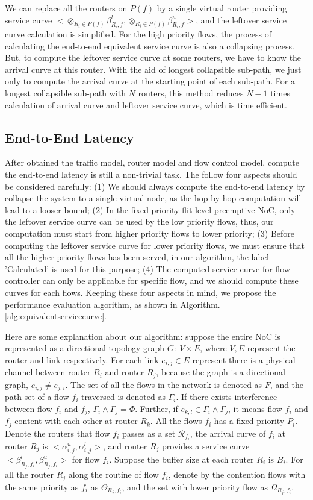 \documentclass[10pt,journal]{IEEEtran}
\begin{document}
We can replace all the routers on $P(f)$ by a single virtual router providing service curve $<\otimes_{R_i\in P(f)}\beta_{R_i,f}^l,\otimes_{R_i\in P(f)}\beta_{R_i,f}^u>$, and the leftover service curve calculation is simplified. For the high priority flows, the process of calculating the end-to-end equivalent service curve is also a collapsing process. But, to compute the leftover service curve at some routers, we have to know the arrival curve at this router. With the aid of longest collapsible sub-path, we just only to compute the arrival curve at the starting point of each sub-path. For a longest collapsible sub-path with $N$ routers, this method reduces $N-1$ times calculation of arrival curve and leftover service curve, which is time efficient.

\subsection{End-to-End Latency}
After obtained the traffic model, router model and flow control model, compute the end-to-end latency is still a non-trivial task. The follow four aspects should be considered carefully: (1) We should always compute the end-to-end latency by collapse the system to a single virtual node, as the hop-by-hop computation will lead to a looser bound; (2) In the fixed-priority flit-level preemptive NoC, only the leftover service curve can be used by the low priority flows, thus, our computation must start from higher priority flows to lower priority; (3) Before computing the leftover service curve for lower priority flows, we must ensure that all the higher priority flows has been served, in our algorithm, the label 'Calculated' is used for this purpose; (4) The computed service curve for flow controller can only be applicable for specific flow, and we should compute these curves for each flows. Keeping these four aspects in mind, we propose the performance evaluation algorithm, as shown in Algorithm. \ref{alg:equivalentservicecurve}.

Here are some explanation about our algorithm: suppose the entire NoC is represented as a directional topology graph $G:\ V\times E$, where $V,E$ represent the router and link respectively. For each link $e_{i,j}\in E$ represent there is a physical channel between router $R_i$ and router $R_j$, because the graph is a directional graph, $e_{i,j}\neq e_{j,i}$. The set of all the flows in the network is denoted as $F$, and the path set of a flow $f_i$ traversed is denoted as $\Gamma_i$. If there exists interference between flow $f_i$ and $f_j$, $\Gamma_i\wedge\Gamma_j=\Phi$. Further, if $e_{k,l}\in\Gamma_i\wedge\Gamma_j$, it means flow $f_i$ and $f_j$ content with each other at router $R_k$. All the flows $f_i$ has a fixed-priority $P_i$. Denote the routers that flow $f_i$ passes as a set $\mathcal{R}_{f_i}$, the arrival curve of $f_i$ at router $R_j$ is $<\alpha_{i,j}^u,\alpha_{i,j}^l>$, and router $R_j$ provides a service curve $<\beta_{R_j,f_i}^l,\beta_{R_j,f_i}^u>$ for flow $f_i$. Suppose the buffer size at each router $R_i$ is $B_i$. For all the router $R_j$ along the routine of flow $f_i$, denote by the contention flows with the same priority as $f_i$ as $\Theta_{R_j,f_i}$, and the set with lower priority flow as $\Omega_{R_j,f_i}$.
\end{document}
